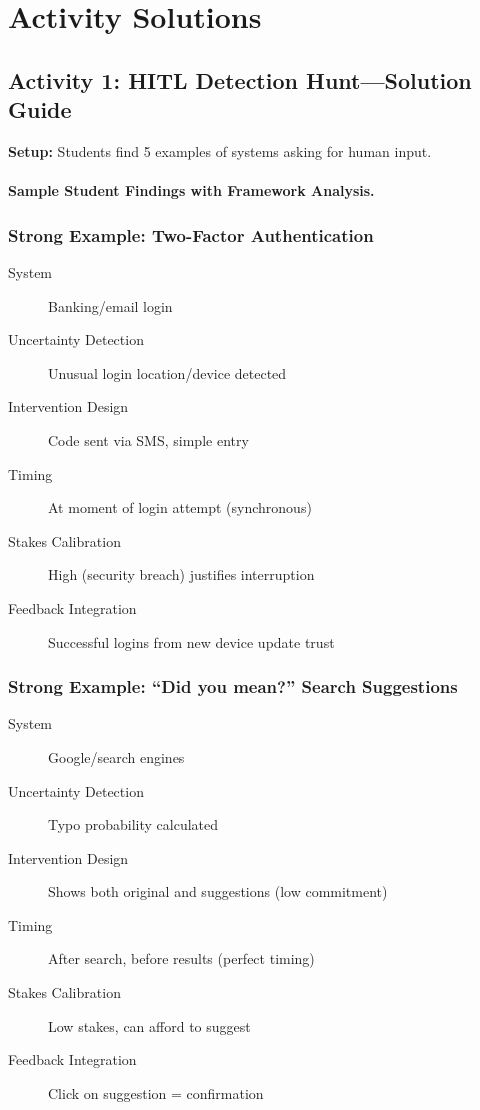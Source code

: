 \section{Activity Solutions}

\subsection{Activity 1: HITL Detection Hunt---Solution Guide}

\textbf{Setup:} Students find 5 examples of systems asking for human input.

\paragraph{Sample Student Findings with Framework Analysis.}

\subsubsection{Strong Example: Two-Factor Authentication}
\begin{description}
    \item[System] Banking/email login
    \item[Uncertainty Detection] Unusual login location/device detected
    \item[Intervention Design] Code sent via SMS, simple entry
    \item[Timing] At moment of login attempt (synchronous)
    \item[Stakes Calibration] High (security breach) justifies interruption
    \item[Feedback Integration] Successful logins from new device update trust
\end{description}

\subsubsection{Strong Example: ``Did you mean?'' Search Suggestions}
\begin{description}
    \item[System] Google/search engines
    \item[Uncertainty Detection] Typo probability calculated
    \item[Intervention Design] Shows both original and suggestions (low commitment)
    \item[Timing] After search, before results (perfect timing)
    \item[Stakes Calibration] Low stakes, can afford to suggest
    \item[Feedback Integration] Click on suggestion = confirmation
\end{description}

